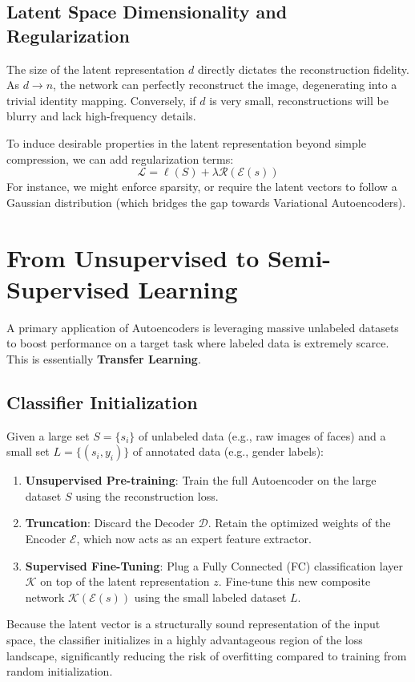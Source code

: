 \subsection{Latent Space Dimensionality and Regularization}
The size of the latent representation $d$ directly dictates the reconstruction fidelity. As $d \to n$, the network can perfectly reconstruct the image, degenerating into a trivial identity mapping. Conversely, if $d$ is very small, reconstructions will be blurry and lack high-frequency details. 

To induce desirable properties in the latent representation beyond simple compression, we can add regularization terms:
\begin{equation}
    \mathcal{L} = \ell(S) + \lambda \mathcal{R}(\mathcal{E}(s))
\end{equation}
For instance, we might enforce sparsity, or require the latent vectors to follow a Gaussian distribution (which bridges the gap towards Variational Autoencoders).

\section{From Unsupervised to Semi-Supervised Learning}
A primary application of Autoencoders is leveraging massive unlabeled datasets to boost performance on a target task where labeled data is extremely scarce. This is essentially \textbf{Transfer Learning}.

\subsection{Classifier Initialization}
Given a large set $S = \{s_i\}$ of unlabeled data (e.g., raw images of faces) and a small set $L = \{(s_i, y_i)\}$ of annotated data (e.g., gender labels):
\begin{enumerate}
    \item \textbf{Unsupervised Pre-training}: Train the full Autoencoder on the large dataset $S$ using the reconstruction loss.
    \item \textbf{Truncation}: Discard the Decoder $\mathcal{D}$. Retain the optimized weights of the Encoder $\mathcal{E}$, which now acts as an expert feature extractor.
    \item \textbf{Supervised Fine-Tuning}: Plug a Fully Connected (FC) classification layer $\mathcal{K}$ on top of the latent representation $z$. Fine-tune this new composite network $\mathcal{K}(\mathcal{E}(s))$ using the small labeled dataset $L$. 
\end{enumerate}
Because the latent vector is a structurally sound representation of the input space, the classifier initializes in a highly advantageous region of the loss landscape, significantly reducing the risk of overfitting compared to training from random initialization.

